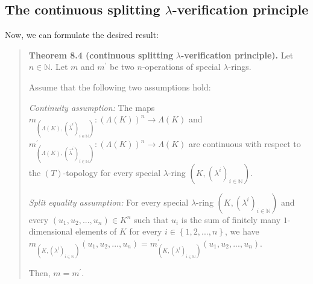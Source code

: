 \documentclass[numbers=enddot,12pt,final,onecolumn,notitlepage]{scrartcl}%
\begin{document}
\subsection{The continuous splitting $\lambda$-verification principle}

Now, we can formulate the desired result:

\begin{quote}
\textbf{Theorem 8.4 (continuous splitting }$\lambda$\textbf{-verification
principle).} Let $n\in\mathbb{N}$. Let $m$ and $m^{\prime}$ be two
$n$-operations of special $\lambda$-rings.

Assume that the following two assumptions hold:

\textit{Continuity assumption:} The maps $m_{\left(  \Lambda\left(  K\right)
,\left(  \widehat{\lambda}^{i}\right)  _{i\in\mathbb{N}}\right)  }:\left(
\Lambda\left(  K\right)  \right)  ^{n}\rightarrow\Lambda\left(  K\right)  $
and $m_{\left(  \Lambda\left(  K\right)  ,\left(  \widehat{\lambda}%
^{i}\right)  _{i\in\mathbb{N}}\right)  }^{\prime}:\left(  \Lambda\left(
K\right)  \right)  ^{n}\rightarrow\Lambda\left(  K\right)  $ are continuous
with respect to the $\left(  T\right)  $-topology for every special $\lambda
$-ring $\left(  K,\left(  \lambda^{i}\right)  _{i\in\mathbb{N}}\right)  $.

\textit{Split equality assumption:} For every special $\lambda$-ring $\left(
K,\left(  \lambda^{i}\right)  _{i\in\mathbb{N}}\right)  $ and every $\left(
u_{1},u_{2},...,u_{n}\right)  \in K^{n}$ such that $u_{i}$ is the sum of
finitely many $1$-dimensional elements of $K$ for every $i\in\left\{
1,2,...,n\right\}  $, we have $m_{\left(  K,\left(  \lambda^{i}\right)
_{i\in\mathbb{N}}\right)  }\left(  u_{1},u_{2},...,u_{n}\right)  =m_{\left(
K,\left(  \lambda^{i}\right)  _{i\in\mathbb{N}}\right)  }^{\prime}\left(
u_{1},u_{2},...,u_{n}\right)  $.

Then, $m=m^{\prime}$.
\end{quote}
\end{document}
